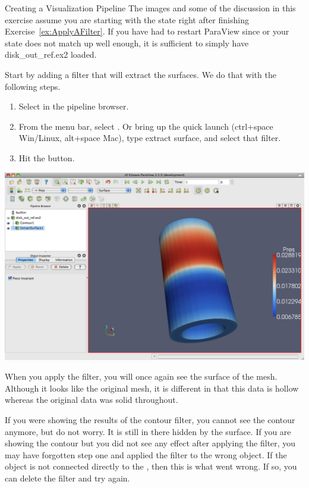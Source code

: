 \begin{exercise}{Creating a Visualization Pipeline}
  \label{ex:CreatingAVisualizationPipeline}%
  The images and some of the discussion in this exercise assume you are
  starting with the state right after finishing
  Exercise~\ref{ex:ApplyAFilter}.  If you have had to restart ParaView
  since or your state does not match up well enough, it is sufficient to
  simply have disk\_out\_ref.ex2 loaded.

  Start by adding a filter that will extract the surfaces.  We do that with
  the following steps.

  \begin{enumerate}
  \item Select  in the pipeline browser.
  \item From the menu bar, select  \ra {} \ra
    .  Or bring up the quick
    launch (ctrl+space Win/Linux, alt+space Mac), type extract surface, and
    select that filter.
  \item Hit the \apply button.
    \savecounter
  \end{enumerate}

  \begin{inlinefig}
    \includegraphics[width=\scw]{images/CutSurface1}
  \end{inlinefig}

  When you apply the  filter, you will once again see
  the surface of the mesh.  Although it looks like the original mesh, it is
  different in that this data is hollow whereas the original data was solid
  throughout.

  If you were showing the results of the contour filter, you cannot see the
  contour anymore, but do not worry.  It is still in there hidden by the
  surface.  If you are showing the contour but you did not see any effect
  after applying the filter, you may have forgotten step one and applied
  the filter to the wrong object.  If the  object is
  not connected directly to the , then this is what
  went wrong.  If so, you can delete the filter and try again.


\end{exercise}
